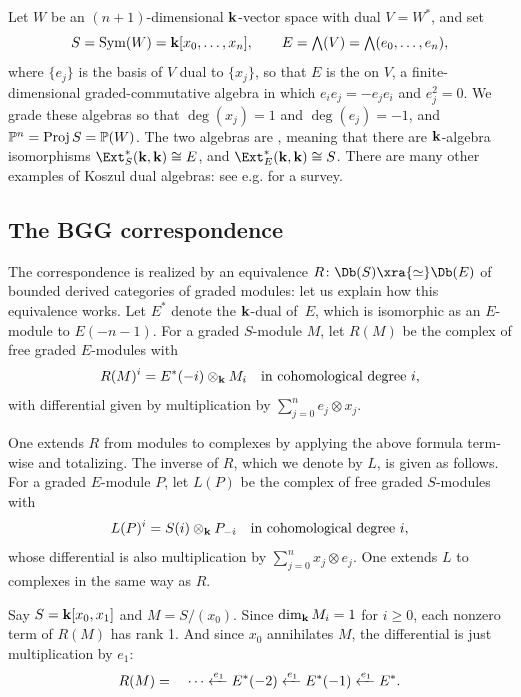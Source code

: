 \documentclass{amsart}
\begin{document}
Let $W$ be an $(n+1)$-dimensional ${\bf k}$-vector space with dual $V = W^*$, and set
\[
S = \operatorname{Sym}(W) = {\bf k}[x_0,\dots,x_n], \qquad
E = \textstyle\bigwedge(V) = \bigwedge(e_0,\dots,e_n),
\]
where $\{e_j\}$ is the basis of $V$ dual to $\{x_j\}$, so that $E$ is the  on $V$, a finite-dimensional graded-commutative algebra in which $e_ie_j=-e_je_i$ and $e_j^2=0$. We grade these algebras so that $\deg(x_j)=1$ and $\deg(e_j)=-1$, and $\mathbb P^n = \operatorname{Proj} S = \mathbb P(W)$. The two algebras are , meaning that there are ${\bf k}$-algebra isomorphisms $\Ext_S^*(\kk, \kk) \cong E$, and $\Ext_E^*(\kk, \kk) \cong S$. There are many other examples of Koszul dual algebras: see e.g. \cite{PolishchukPositselski2005} for a survey.


\subsection{The BGG correspondence}

The correspondence is realized by an equivalence $R \co \Db(S) \xra{\simeq} \Db(E)$ of bounded derived categories of graded modules: let us explain how this equivalence works. Let $E^*$ denote the ${\bf k}$-dual of~$E$, which is isomorphic as an $E$-module to $E(-n-1)$. For a graded $S$-module $M$, let $R(M)$ be the complex of free graded $E$-modules with
  \[   R(M)^i =  E^*(-i) \otimes_{\bf k} M_{i} \quad\text{in cohomological degree } i, \]
  with differential given by multiplication by $\sum_{j = 0}^n e_j \otimes x_j$. 
 
  
  One extends $R$ from modules to complexes by applying the above formula term-wise and totalizing. The inverse of $R$, which we denote by $L$, is given as follows. For a graded $E$-module $P$, let $L(P)$ be the complex of free graded $S$-modules with
  \[ L(P)^i = S(i) \otimes_{\bf k} P_{-i} \quad\text{in cohomological degree } i, \]
  whose differential is also multiplication by $\sum_{j = 0}^n x_j \otimes e_j$. One extends $L$ to complexes in the same way as $R$.

\begin{example}\label{ex:Rfunctor}
  Say $S = \mathbf{k}[x_0, x_1]$ and $M = S / (x_0)$. Since $\dim_{\mathbf{k}} M_i = 1$ for $i \ge 0$, each nonzero term of $R(M)$ has rank 1. And since $x_0$ annihilates $M$, the differential is just multiplication by $e_1$:
  $$
  R(M) = \quad \cdots \xleftarrow{e_1} E^*(-2) \xleftarrow{e_1} E^*(-1) \xleftarrow{e_1} E^*.
  $$
\end{example}
\end{document}

